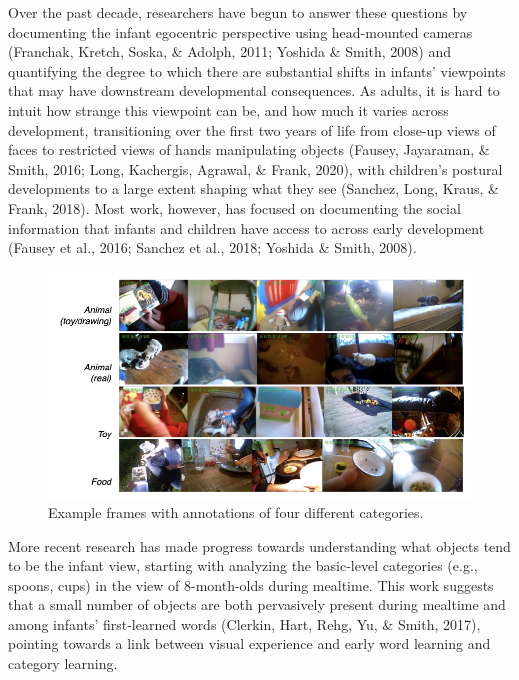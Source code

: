 \documentclass[10pt, letterpaper]{article}
\newenvironment{CodeChunk}{}{}
\begin{document}
Over the past decade, researchers have begun to answer these questions
by documenting the infant egocentric perspective using head-mounted
cameras (Franchak, Kretch, Soska, \& Adolph, 2011; Yoshida \& Smith,
2008) and quantifying the degree to which there are substantial shifts
in infants' viewpoints that may have downstream developmental
consequences. As adults, it is hard to intuit how strange this viewpoint
can be, and how much it varies across development, transitioning over
the first two years of life from close-up views of faces to restricted
views of hands manipulating objects (Fausey, Jayaraman, \& Smith, 2016;
Long, Kachergis, Agrawal, \& Frank, 2020), with children's postural
developments to a large extent shaping what they see (Sanchez, Long,
Kraus, \& Frank, 2018). Most work, however, has focused on documenting
the social information that infants and children have access to across
early development (Fausey et al., 2016; Sanchez et al., 2018; Yoshida \&
Smith, 2008).

\begin{CodeChunk}
\begin{figure}[h]

{\centering \includegraphics{figs/examples-1} 

}

\caption[Example frames with annotations of four different categories]{Example frames with annotations of four different categories.}\label{fig:examples}
\end{figure}
\end{CodeChunk}

More recent research has made progress towards understanding what
objects tend to be the infant view, starting with analyzing the
basic-level categories (e.g., spoons, cups) in the view of 8-month-olds
during mealtime. This work suggests that a small number of objects are
both pervasively present during mealtime and among infants'
first-learned words (Clerkin, Hart, Rehg, Yu, \& Smith, 2017), pointing
towards a link between visual experience and early word learning and
category learning.
\end{document}
